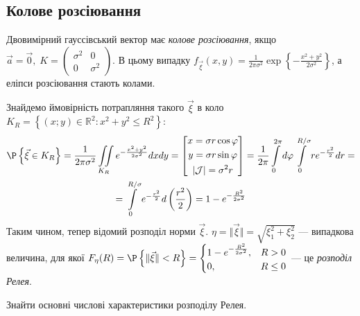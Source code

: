 \subsection{Колове розсіювання}
\begin{definition}
    Двовимірний гауссівський вектор має \emph{колове розсіювання}, якщо
    $\vec{a} = \vec{0}, \; K = \begin{pmatrix}
        \sigma^2 & 0 \\
        0 & \sigma^2
    \end{pmatrix}$. В цьому випадку $f_{\vec{\xi}}(x, y) = \frac{1}{2\pi\sigma^2} \exp\left\{-\frac{x^2+y^2}{2\sigma^2}\right\}$, 
    а еліпси розсіювання стають колами.
\end{definition}
Знайдемо ймовірність потрапляння такого $\vec{\xi}$ в коло $K_R = \left\{(x; y) \in \mathbb{R}^2 : x^2 + y^2 \leq R^2\right\}$:
\begin{gather*}
    \P\left\{\vec{\xi} \in K_R\right\} = \frac{1}{2\pi\sigma^2} \iint\limits_{K_R} e^{-\frac{x^2+y^2}{2\sigma^2}} dx dy = 
    \left[ \begin{gathered}
        x = \sigma r\cos\varphi \\
        y = \sigma r\sin\varphi \\
        |\mathcal{J}| = \sigma^2 r
    \end{gathered}\right] =
    \frac{1}{2\pi} \int\limits_0^{2\pi} d\varphi \int\limits_0^{R/\sigma} r e^{-\frac{r^2}{2}} dr = \\
    = \int\limits_0^{R/\sigma} e^{-\frac{r^2}{2}} d \left( \frac{r^2}{2}\right) = 
    1 - e^{-\frac{R^2}{2\sigma^2}}
\end{gather*}
Таким чином, тепер відомий розподіл норми $\vec{\xi}$. $\eta = \Vert \vec{\xi} \Vert = \sqrt{\xi_1^2 + \xi_2^2}$ --- випадкова величина,
для якої $F_{\eta}(R) = \P\left\{\Vert \vec{\xi} \Vert < R\right\} = \begin{cases}
    1 - e^{-\frac{R^2}{2\sigma^2}}, & R > 0 \\
    0, & R \leq 0
\end{cases}$ --- це \emph{розподіл Релея}.

\begin{exercise}
    Знайти основні числові характеристики розподілу Релея.
\end{exercise}

